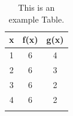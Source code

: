 
\begin{table}
\caption{This is an example Table.}
\begin{center}
\begin{tabular}{ccc}
x & f(x) & g(x) \\
\midrule
1 & 6 & 4  \\
2 & 6 & 3  \\
3 & 6 & 2  \\
4 & 6 & 2  \\
\label{Table in Chapter 1}
\end{tabular}
\end{center}
\end{table}
